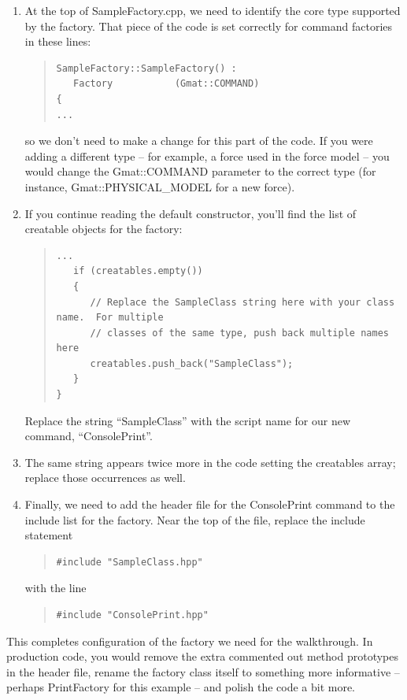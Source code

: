 \documentclass[10pt,letterpaper]{article}
\begin{document}
\begin{enumerate}
\setcounter{enumi}{\value{saveenum}}
\item At the top of SampleFactory.cpp, we need to identify the core type supported by the factory.  That piece of the code is set correctly for command factories in these lines:
\begin{quote}
\begin{verbatim}
SampleFactory::SampleFactory() :
   Factory           (Gmat::COMMAND)
{
...
\end{verbatim}
\end{quote}
so we don't need to make a change for this part of the code.  If you were adding a different type -- for example, a force used in the force model -- you would change the Gmat::COMMAND parameter to the correct type (for instance, Gmat::PHYSICAL{\_}MODEL for a new force).
\item If you continue reading the default constructor, you'll find the list of creatable objects for the factory: 
\begin{quote}
\begin{verbatim}
...
   if (creatables.empty())
   {
      // Replace the SampleClass string here with your class name.  For multiple 
      // classes of the same type, push back multiple names here
      creatables.push_back("SampleClass");
   }
}
\end{verbatim}
\end{quote}
Replace the string ``SampleClass'' with the script name for our new command, ``ConsolePrint''.
\item The same string appears twice more in the code setting the creatables array; replace those occurrences as well.
\item Finally, we need to add the header file for the ConsolePrint command to the include list for the factory.  Near the top of the file, replace the include statement
\begin{quote}
\begin{verbatim}
#include "SampleClass.hpp"
\end{verbatim}
\end{quote}
with the line
\begin{quote}
\begin{verbatim}
#include "ConsolePrint.hpp"
\end{verbatim}
\end{quote}
\setcounter{saveenum}{\value{enumi}}
\end{enumerate}

This completes configuration of the factory we need for the walkthrough.  In production code, you would remove the extra commented out method prototypes in the header file, rename the factory class itself to something more informative -- perhaps PrintFactory for this example -- and polish the code a bit more.  
\end{document}

